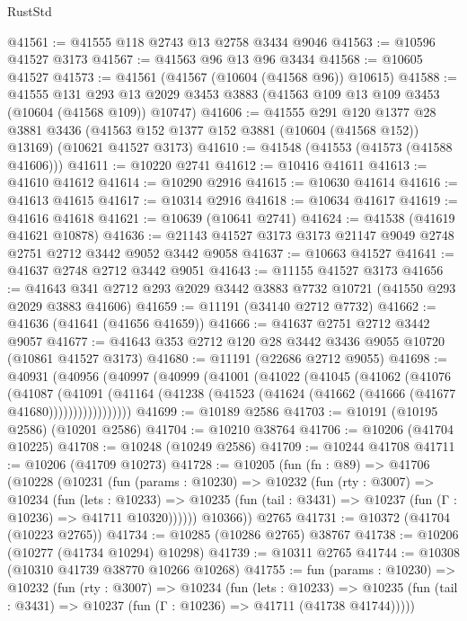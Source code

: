 \begin{lexlean}{RustStd}
\begin{coremodule}
@41561 := @41555 @118 @2743 @13 @2758 @3434 @9046
@41563 := @10596 @41527 @3173
@41567 := @41563 @96 @13 @96 @3434
@41568 := @10605 @41527
@41573 := @41561 (@41567 (@10604 (@41568 @96)) @10615)
@41588 := @41555
    @131
    @293
    @13
    @2029
    @3453
    @3883
    (@41563 @109 @13 @109 @3453 (@10604 (@41568 @109)) @10747)
@41606 := @41555
    @291
    @120
    @1377
    @28
    @3881
    @3436
    (@41563 @152 @1377 @152 @3881 (@10604 (@41568 @152)) @13169)
    (@10621 @41527 @3173)
@41610 := @41548 (@41553 (@41573 (@41588 @41606)))
@41611 := @10220 @2741
@41612 := @10416 @41611
@41613 := @41610 @41612
@41614 := @10290 @2916
@41615 := @10630 @41614
@41616 := @41613 @41615
@41617 := @10314 @2916
@41618 := @10634 @41617
@41619 := @41616 @41618
@41621 := @10639 (@10641 @2741)
@41624 := @41538 (@41619 @41621 @10878)
@41636 := @21143 @41527 @3173 @3173 @21147 @9049 @2748 @2751 @2712 @3442 @9052 @3442 @9058
@41637 := @10663 @41527
@41641 := @41637 @2748 @2712 @3442 @9051
@41643 := @11155 @41527 @3173
@41656 := @41643 @341 @2712 @293 @2029 @3442 @3883 @7732 @10721 (@41550 @293 @2029 @3883 @41606)
@41659 := @11191 (@34140 @2712 @7732)
@41662 := @41636 (@41641 (@41656 @41659))
@41666 := @41637 @2751 @2712 @3442 @9057
@41677 := @41643 @353 @2712 @120 @28 @3442 @3436 @9055 @10720 (@10861 @41527 @3173)
@41680 := @11191 (@22686 @2712 @9055)
@41698 := @40931
    (@40956
      (@40997
        (@40999
          (@41001
            (@41022
              (@41045
                (@41062
                  (@41076
                    (@41087
                      (@41091
                        (@41164
                          (@41238 (@41523 (@41624 (@41662 (@41666 (@41677 @41680)))))))))))))))))
@41699 := @10189 @2586
@41703 := @10191 (@10195 @2586) (@10201 @2586)
@41704 := @10210 @38764
@41706 := @10206 (@41704 @10225)
@41708 := @10248 (@10249 @2586)
@41709 := @10244 @41708
@41711 := @10206 (@41709 @10273)
@41728 := @10205
    (fun (fn : @89) =>
    @41706
      (@10228
        (@10231
          (fun (params : @10230) =>
          @10232
            (fun (rty : @3007) =>
            @10234
              (fun (lets : @10233) =>
              @10235 (fun (tail : @3431) => @10237 (fun (Γ : @10236) => @41711 @10320))))))
        @10366))
    @2765
@41731 := @10372 (@41704 (@10223 @2765))
@41734 := @10285 (@10286 @2765) @38767
@41738 := @10206 (@10277 (@41734 @10294) @10298)
@41739 := @10311 @2765
@41744 := @10308 (@10310 @41739 @38770 @10266 @10268)
@41755 := fun (params : @10230) =>
  @10232
    (fun (rty : @3007) =>
    @10234
      (fun (lets : @10233) =>
      @10235 (fun (tail : @3431) => @10237 (fun (Γ : @10236) => @41711 (@41738 @41744)))))

\end{coremodule}
\end{lexlean}

